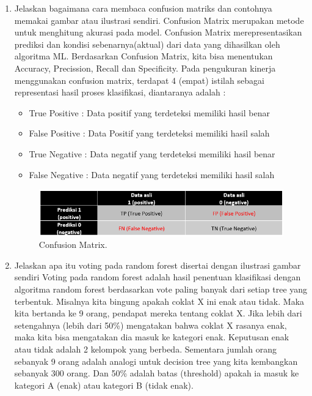 \begin{enumerate}
	\item Jelaskan bagaimana cara membaca confusion matriks dan contohnya memakai gambar atau ilustrasi sendiri.
	\hfill\break
	Confusion Matrix merupakan metode untuk menghitung akurasi pada model. Confusion Matrix merepresentasikan prediksi dan kondisi sebenarnya(aktual) dari data yang dihasilkan oleh algoritma ML. Berdasarkan Confusion Matrix, kita bisa menentukan Accuracy, Precission, Recall dan Specificity. Pada pengukuran kinerja menggunakan confusion matrix, terdapat 4 (empat) istilah sebagai representasi hasil proses klasifikasi, diantaranya adalah :
	\begin{itemize}
		\item True Positive : Data positif yang terdeteksi memiliki hasil benar
		\item False Positive : Data Positif yang terdeteksi memiliki hasil salah
		\item True Negative : Data negatif yang terdeteksi memiliki hasil benar
		\item False Negative : Data negatif yang terdeteksi memiliki hasil salah
	\end{itemize}

	\hfill\break
	\begin{figure}[H]
		\includegraphics[width=8 cm]{figures/1174006/chapter2/teori/6.png}
		\centering
		\caption{Confusion Matrix.}
	\end{figure}

	\item Jelaskan apa itu voting pada random forest disertai dengan ilustrasi gambar sendiri
	\hfill\break
	Voting pada random forest adalah hasil penentuan klasifikasi dengan algoritma random forest berdasarkan vote paling banyak dari setiap tree yang terbentuk. Misalnya kita bingung apakah coklat X ini enak atau tidak. Maka kita bertanda ke 9 orang, pendapat mereka tentang coklat X. Jika lebih dari setengahnya (lebih dari 50\%) mengatakan bahwa coklat X rasanya enak, maka kita bisa mengatakan dia masuk ke kategori enak.
	Keputusan enak atau tidak adalah 2 kelompok yang berbeda. Sementara jumlah orang sebanyak 9 orang adalah analogi untuk decision tree yang kita kembangkan sebanyak 300 orang. Dan 50\% adalah batas (threshold) apakah ia masuk ke kategori A (enak) atau kategori B (tidak enak).


\end{enumerate}
